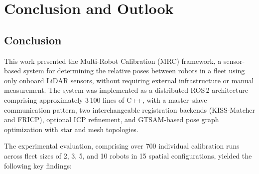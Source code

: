 \chapter{Conclusion and Outlook}
\label{ch:conclusion_outlook}

\section{Conclusion}

This work presented the Multi-Robot Calibration (MRC) framework, a
sensor-based system for determining the relative poses between robots
in a fleet using only onboard LiDAR sensors, without requiring
external infrastructure or manual measurement.
The system was implemented as a distributed ROS\,2 architecture
comprising approximately 3\,100 lines of C++, with a master--slave
communication pattern, two interchangeable registration backends
(KISS-Matcher and FRICP), optional ICP refinement, and GTSAM-based
pose graph optimization with star and mesh topologies.

The experimental evaluation, comprising over 700 individual calibration
runs across fleet sizes of 2, 3, 5, and 10 robots in 15 spatial
configurations, yielded the following key findings:


